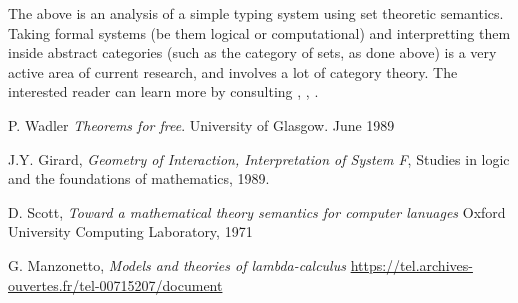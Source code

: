 \documentclass[12pt]{article}
\theoremstyle{plain}
\theoremstyle{definition}
\begin{document}
		The above is an analysis of a simple typing system using set theoretic semantics. Taking formal systems (be them logical or computational) and interpretting them inside abstract categories (such as the category of sets, as done above) is a very active area of current research, and involves a lot of category theory. The interested reader can learn more by consulting \cite{Girard}, \cite{Scott}, \cite{Manzonetto}.
	
	\begin{thebibliography}{99}
		 P. Wadler \emph{Theorems for free}.  University of Glasgow. June 1989
		
		 J.Y. Girard, \emph{Geometry of Interaction, Interpretation of System F}, Studies in logic and the foundations of mathematics, 1989.
		
		 D. Scott, \emph{Toward a mathematical theory semantics for computer lanuages} Oxford University Computing Laboratory, 1971
		
		 G. Manzonetto, \emph{Models and theories of lambda-calculus} \url{https://tel.archives-ouvertes.fr/tel-00715207/document}
		
		\end{thebibliography}
	
	
	
	
	
	
	
	
	
	
	
	
	
	
	
	
	
	
	
	
	
	
	
	
	
	
\end{document}
